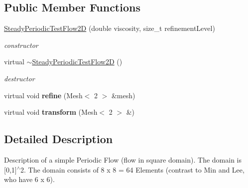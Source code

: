 \subsection*{Public Member Functions}
\begin{DoxyCompactItemize}
\item 
\hyperlink{classnatrium_1_1SteadyPeriodicTestFlow2D_a7db4598e86b34158612497ea2ff0ca74}{SteadyPeriodicTestFlow2D} (double viscosity, size\_\-t refinementLevel)
\begin{DoxyCompactList}\small\item\em constructor \item\end{DoxyCompactList}\item 
\hypertarget{classnatrium_1_1SteadyPeriodicTestFlow2D_a7344b71a404f2c4bbc73c1c738fdfa22}{
virtual \hyperlink{classnatrium_1_1SteadyPeriodicTestFlow2D_a7344b71a404f2c4bbc73c1c738fdfa22}{$\sim$SteadyPeriodicTestFlow2D} ()}
\label{classnatrium_1_1SteadyPeriodicTestFlow2D_a7344b71a404f2c4bbc73c1c738fdfa22}

\begin{DoxyCompactList}\small\item\em destructor \item\end{DoxyCompactList}\item 
\hypertarget{classnatrium_1_1SteadyPeriodicTestFlow2D_a6eef1acb8fcc6236eb6ff9b678bb5937}{
virtual void {\bfseries refine} (Mesh$<$ 2 $>$ \&mesh)}
\label{classnatrium_1_1SteadyPeriodicTestFlow2D_a6eef1acb8fcc6236eb6ff9b678bb5937}

\item 
\hypertarget{classnatrium_1_1SteadyPeriodicTestFlow2D_af3268cd51cda2292d673dfd826346bc9}{
virtual void {\bfseries transform} (Mesh$<$ 2 $>$ \&)}
\label{classnatrium_1_1SteadyPeriodicTestFlow2D_af3268cd51cda2292d673dfd826346bc9}

\end{DoxyCompactItemize}


\subsection{Detailed Description}
Description of a simple Periodic Flow (flow in square domain). The domain is \mbox{[}0,1\mbox{]}$^\wedge$2. The domain consists of 8 x 8 = 64 Elements (contrast to Min and Lee, who have 6 x 6). 


